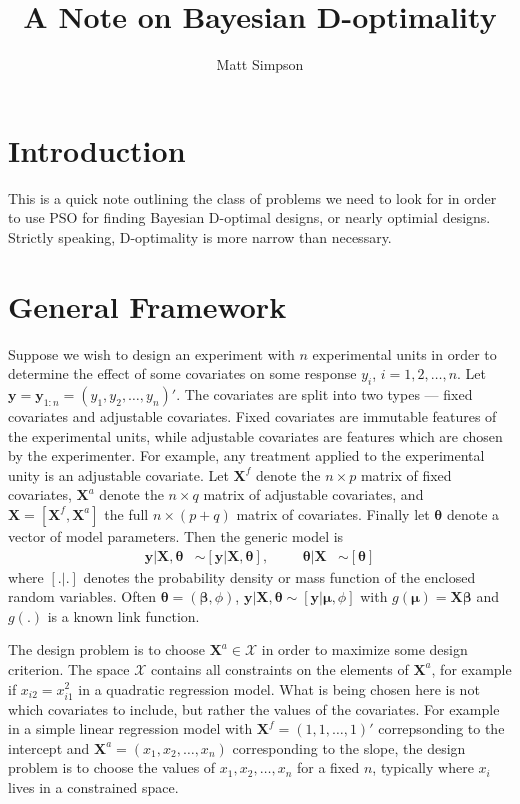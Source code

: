\documentclass[12pt]{article}
\title{A Note on Bayesian D-optimality}
\author{Matt Simpson}
\begin{document}
\maketitle
\section{Introduction}
This is a quick note outlining the class of problems we need to look for in order to use PSO for finding Bayesian D-optimal designs, or nearly optimial designs. Strictly speaking, D-optimality is more narrow than necessary. 
\section{General Framework}
Suppose we wish to design an experiment with $n$ experimental units in order to determine the effect of some covariates on some response $y_i$, $i=1,2,\dots,n$. Let $\bm{y}=\bm{y}_{1:n}=(y_1,y_2,\dots,y_n)'$. The covariates are split into two types --- fixed covariates and adjustable covariates. Fixed covariates are immutable features of the experimental units, while adjustable covariates are features which are chosen by the experimenter. For example, any treatment applied to the experimental unity is an adjustable covariate. Let $\bm{X}^f$ denote the $n\times p$ matrix of fixed covariates, $\bm{X}^a$ denote the $n\times q$ matrix of adjustable covariates, and $\bm{X}=[\bm{X}^f, \bm{X}^a]$ the full $n\times(p+q)$ matrix of covariates. Finally let $\bm{\theta}$ denote a vector of model parameters. Then the generic model is
\begin{align*}
\bm{y}|\bm{X},\bm{\theta} &\sim [\bm{y}|\bm{X},\bm{\theta}], &&& \bm{\theta}|\bm{X}&\sim [\bm{\theta}]
\end{align*}
where $[.|.]$ denotes the probability density or mass function of the enclosed random variables. Often $\bm{\theta}=(\bm{\beta},\phi)$, $\bm{y}|\bm{X},\bm{\theta}\sim [\bm{y}|\bm{\mu},\phi]$ with $g(\bm{\mu}) = \bm{X}\bm{\beta}$ and $g(.)$ is a known link function.

The design problem is to choose $\bm{X}^a \in \mathcal{X}$ in order to maximize some design criterion. The space $\mathcal{X}$ contains all constraints on the elements of $\bm{X}^a$, for example if $x_{i2} = x_{i1}^2$ in a quadratic regression model. What is being chosen here is not which covariates to include, but rather the values of the covariates. For example in a simple linear regression model with $\bm{X}^f = (1,1,\dots,1)'$ correpsonding to the intercept and $\bm{X}^a=(x_1,x_2,\dots,x_n)$ corresponding to the slope, the design problem is to choose the values of $x_1, x_2, \dots, x_n$ for a fixed $n$, typically where $x_i$ lives in a constrained space.
\end{document}
